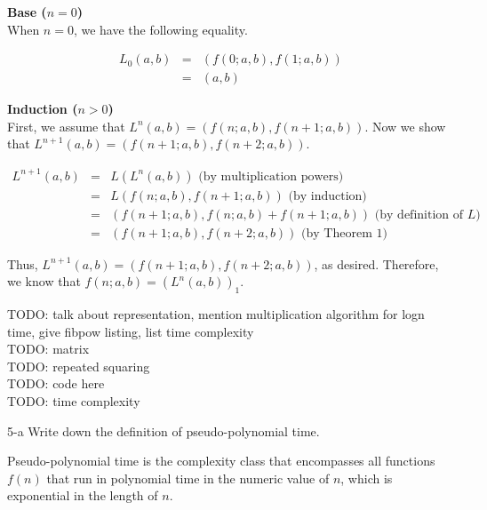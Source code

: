 \documentclass[11pt]{article}
\begin{document}
\begin{prob}{3}
\end{prob}
\begin{sol}

\textbf{Base ($n = 0$)} \\
When $n = 0$, we have the following equality.

\begin{eqnarray*}
L_{0}(a,b) & = & (f(0;a,b),f(1;a,b)) \\
& = & (a, b)
\end{eqnarray*}

\textbf{Induction ($n > 0$)} \\
First, we assume that $L^{n}(a,b) = (f(n;a,b),f(n + 1;a,b))$. Now we show that $L^{n+1}(a,b) = (f(n + 1;a,b),f(n + 2;a,b))$.

\begin{eqnarray*}
L^{n + 1}(a,b) & = & L(L^{n}(a,b)) \text{ (by multiplication powers)}\\
& = & L(f(n;a,b),f(n + 1;a,b)) \text{ (by induction)} \\
& = & (f(n + 1;a,b), f(n;a,b) + f(n + 1;a,b)) \text{ (by definition of $L$)} \\
& = & (f(n + 1;a,b), f(n + 2;a,b)) \text{ (by Theorem 1)}
\end{eqnarray*}

Thus, $L^{n+1}(a,b) = (f(n + 1;a,b),f(n + 2;a,b))$, as desired. Therefore, we know that $f(n;a,b) = (L^{n}(a,b))_{1}$.

\end{sol}

\begin{prob}{4}
\end{prob}
\begin{sol}
TODO: talk about representation, mention multiplication algorithm for logn time, give fibpow listing, list time complexity \\
TODO: matrix \\
TODO: repeated squaring \\
TODO: code here \\
TODO: time complexity
\end{sol}

\begin{prob}{5-a}
Write down the definition of pseudo-polynomial time.
\end{prob}
\begin{sol}
\begin{define}
Pseudo-polynomial time is the complexity class that encompasses all functions $f(n)$ that run in polynomial time in the numeric value of $n$, which is exponential in the length of $n$. 
\end{define}
\end{sol}
\end{document}
